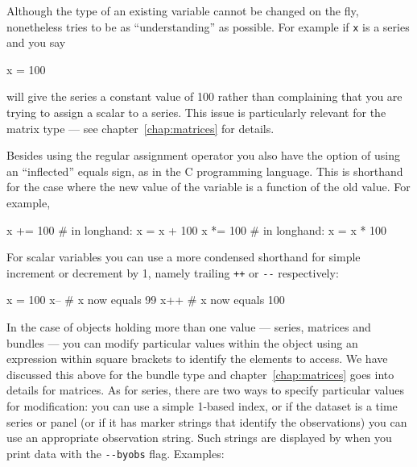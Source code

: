 
Although the type of an existing variable cannot be changed on the
fly,  nonetheless tries to be as ``understanding'' as
possible. For example if \texttt{x} is a series and you say

\begin{code}
x = 100
\end{code} 

 will give the series a constant value of 100 rather than
complaining that you are trying to assign a scalar to a series. This
issue is particularly relevant for the matrix type --- see
chapter~\ref{chap:matrices} for details.

Besides using the regular assignment operator you also have the option
of using an ``inflected'' equals sign, as in the C programming
language. This is shorthand for the case where the new value of the
variable is a function of the old value. For example,

\begin{code}
x += 100 # in longhand: x = x + 100
x *= 100 # in longhand: x = x * 100
\end{code} 

For scalar variables you can use a more condensed shorthand for simple
increment or decrement by 1, namely trailing \texttt{++} or \verb|--|
respectively:

\begin{code}
x = 100
x--     # x now equals 99
x++     # x now equals 100
\end{code}

In the case of objects holding more than one value --- series,
matrices and bundles --- you can modify particular values within the
object using an expression within square brackets to identify the
elements to access. We have discussed this above for the bundle type
and chapter~\ref{chap:matrices} goes into details for matrices. As for
series, there are two ways to specify particular values for
modification: you can use a simple 1-based index, or if the dataset is
a time series or panel (or if it has marker strings that identify the
observations) you can use an appropriate observation string. Such
strings are displayed by  when you print data with the 
\verb|--byobs| flag. Examples:

